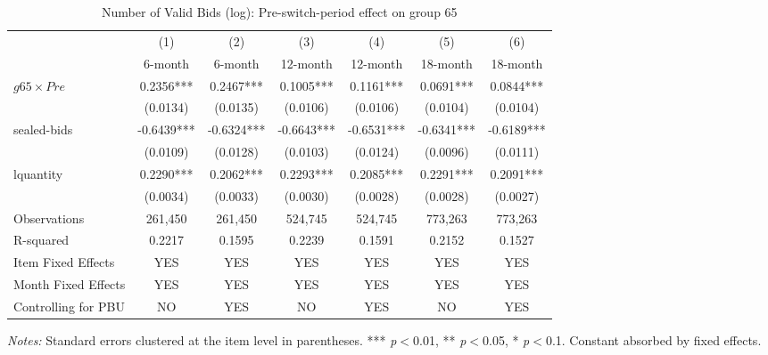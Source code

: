\begin{table}[htbp]
\centering
\caption{Number of Valid Bids (log): Pre-switch-period effect on group 65}
\label{tab:validbids}
\begin{adjustbox}{max width=\textwidth}
\begin{threeparttable}
\small
\begin{tabular}{lcccccc}
\toprule
 & (1) & (2) & (3) & (4) & (5) & (6) \\
 & 6-month & 6-month & 12-month & 12-month & 18-month & 18-month \\
\midrule
$g65 \times Pre$ & 0.2356*** & 0.2467*** & 0.1005*** & 0.1161*** & 0.0691*** & 0.0844*** \\
 & (0.0134) & (0.0135) & (0.0106) & (0.0106) & (0.0104) & (0.0104) \\
sealed-bids & -0.6439*** & -0.6324*** & -0.6643*** & -0.6531*** & -0.6341*** & -0.6189*** \\
 & (0.0109) & (0.0128) & (0.0103) & (0.0124) & (0.0096) & (0.0111) \\
lquantity & 0.2290*** & 0.2062*** & 0.2293*** & 0.2085*** & 0.2291*** & 0.2091*** \\
 & (0.0034) & (0.0033) & (0.0030) & (0.0028) & (0.0028) & (0.0027) \\
\midrule
Observations & 261,450 & 261,450 & 524,745 & 524,745 & 773,263 & 773,263 \\
R-squared & 0.2217 & 0.1595 & 0.2239 & 0.1591 & 0.2152 & 0.1527 \\
Item Fixed Effects & YES & YES & YES & YES & YES & YES \\
Month Fixed Effects & YES & YES & YES & YES & YES & YES \\
Controlling for PBU & NO & YES & NO & YES & NO & YES \\
\bottomrule
\end{tabular}
\begin{tablenotes}
\small
\item \textit{Notes:} Standard errors clustered at the item level in parentheses.
*** \textit{p}$<$0.01, ** \textit{p}$<$0.05, * \textit{p}$<$0.1.
Constant absorbed by fixed effects.
\end{tablenotes}
\end{threeparttable}
\end{adjustbox}
\end{table}
